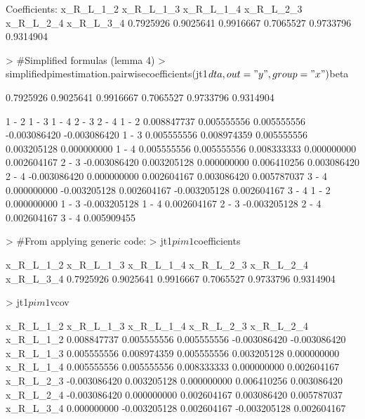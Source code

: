 \documentclass[12pt]{article}
\begin{document}
\begin{Schunk}
\begin{Soutput}
Coefficients:
x_R_L_1_2 x_R_L_1_3 x_R_L_1_4 x_R_L_2_3 x_R_L_2_4 x_R_L_3_4 
0.7925926 0.9025641 0.9916667 0.7065527 0.9733796 0.9314904 
\end{Soutput}
\begin{Sinput}
> 	#Simplified formulas (lemma 4)
> 	simplifiedpimestimation.pairwisecoefficients(jt1$dta, out="y", group="x")$beta
\end{Sinput}
\begin{Soutput}
[1] 0.7925926 0.9025641 0.9916667 0.7065527 0.9733796 0.9314904
\end{Soutput}
\begin{Soutput}
             1 - 2        1 - 3       1 - 4        2 - 3        2 - 4
1 - 2  0.008847737  0.005555556 0.005555556 -0.003086420 -0.003086420
1 - 3  0.005555556  0.008974359 0.005555556  0.003205128  0.000000000
1 - 4  0.005555556  0.005555556 0.008333333  0.000000000  0.002604167
2 - 3 -0.003086420  0.003205128 0.000000000  0.006410256  0.003086420
2 - 4 -0.003086420  0.000000000 0.002604167  0.003086420  0.005787037
3 - 4  0.000000000 -0.003205128 0.002604167 -0.003205128  0.002604167
             3 - 4
1 - 2  0.000000000
1 - 3 -0.003205128
1 - 4  0.002604167
2 - 3 -0.003205128
2 - 4  0.002604167
3 - 4  0.005909455
\end{Soutput}
\begin{Sinput}
> 	#From applying generic code:
> 	jt1$pim1$coefficients
\end{Sinput}
\begin{Soutput}
x_R_L_1_2 x_R_L_1_3 x_R_L_1_4 x_R_L_2_3 x_R_L_2_4 x_R_L_3_4 
0.7925926 0.9025641 0.9916667 0.7065527 0.9733796 0.9314904 
\end{Soutput}
\begin{Sinput}
> 	jt1$pim1$vcov
\end{Sinput}
\begin{Soutput}
             x_R_L_1_2    x_R_L_1_3   x_R_L_1_4    x_R_L_2_3    x_R_L_2_4
x_R_L_1_2  0.008847737  0.005555556 0.005555556 -0.003086420 -0.003086420
x_R_L_1_3  0.005555556  0.008974359 0.005555556  0.003205128  0.000000000
x_R_L_1_4  0.005555556  0.005555556 0.008333333  0.000000000  0.002604167
x_R_L_2_3 -0.003086420  0.003205128 0.000000000  0.006410256  0.003086420
x_R_L_2_4 -0.003086420  0.000000000 0.002604167  0.003086420  0.005787037
x_R_L_3_4  0.000000000 -0.003205128 0.002604167 -0.003205128  0.002604167

\end{Soutput}
\end{Schunk}
\end{document}
